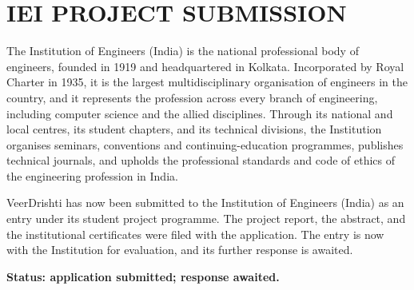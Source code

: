 \clearpage
{}
\label{submission:iei}
\thispagestyle{report}
\section*{IEI PROJECT SUBMISSION}
The Institution of Engineers (India) is the national professional body of
engineers, founded in 1919 and headquartered in Kolkata. Incorporated by Royal
Charter in 1935, it is the largest multidisciplinary organisation of engineers in
the country, and it represents the profession across every branch of engineering,
including computer science and the allied disciplines. Through its national and
local centres, its student chapters, and its technical divisions, the Institution
organises seminars, conventions and continuing-education programmes, publishes
technical journals, and upholds the professional standards and code of ethics of
the engineering profession in India.

VeerDrishti has now been submitted to the Institution of Engineers (India) as an
entry under its student project programme. The project report, the abstract, and
the institutional certificates were filed with the application. The entry is now
with the Institution for evaluation, and its further response is awaited.

\textbf{Status: application submitted; response awaited.}
